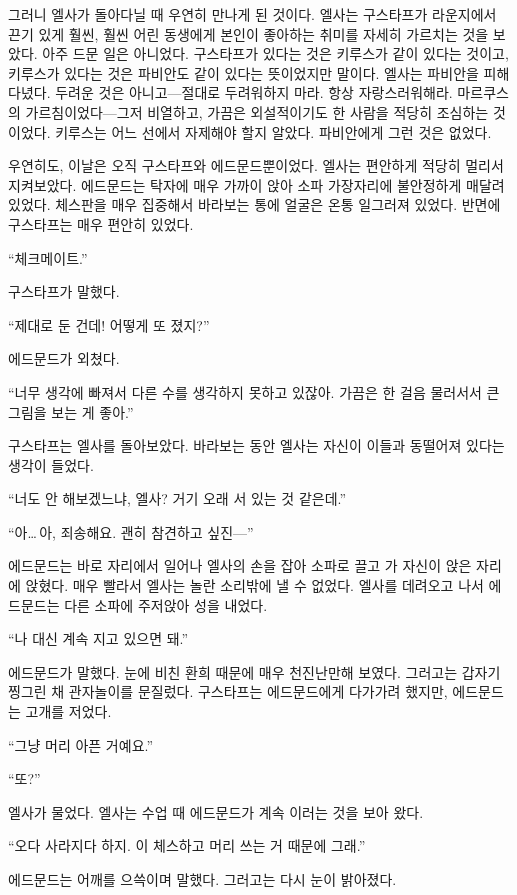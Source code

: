 그러니 엘사가 돌아다닐 때 우연히 만나게 된 것이다. 엘사는 구스타프가 라운지에서 끈기 있게 훨씬, 훨씬 어린 동생에게 본인이 좋아하는 취미를 자세히 가르치는 것을 보았다. 아주 드문 일은 아니었다. 구스타프가 있다는 것은 키루스가 같이 있다는 것이고, 키루스가 있다는 것은 파비안도 같이 있다는 뜻이었지만 말이다. 엘사는 파비안을 피해 다녔다. 두려운 것은 아니고—절대로 두려워하지 마라. 항상 자랑스러워해라. 마르쿠스의 가르침이었다—그저 비열하고, 가끔은 외설적이기도 한 사람을 적당히 조심하는 것이었다. 키루스는 어느 선에서 자제해야 할지 알았다. 파비안에게 그런 것은 없었다.

우연히도, 이날은 오직 구스타프와 에드문드뿐이었다. 엘사는 편안하게 적당히 멀리서 지켜보았다. 에드문드는 탁자에 매우 가까이 앉아 소파 가장자리에 불안정하게 매달려 있었다. 체스판을 매우 집중해서 바라보는 통에 얼굴은 온통 일그러져 있었다. 반면에 구스타프는 매우 편안히 있었다.

``체크메이트.''

구스타프가 말했다.

``제대로 둔 건데! 어떻게 또 졌지?''

에드문드가 외쳤다.

``너무 생각에 빠져서 다른 수를 생각하지 못하고 있잖아. 가끔은 한 걸음 물러서서 큰 그림을 보는 게 좋아.''

구스타프는 엘사를 돌아보았다. 바라보는 동안 엘사는 자신이 이들과 동떨어져 있다는 생각이 들었다.

``너도 안 해보겠느냐, 엘사? 거기 오래 서 있는 것 같은데.''

``아\ldots\,아, 죄송해요. 괜히 참견하고 싶진—''

에드문드는 바로 자리에서 일어나 엘사의 손을 잡아 소파로 끌고 가 자신이 앉은 자리에 앉혔다. 매우 빨라서 엘사는 놀란 소리밖에 낼 수 없었다. 엘사를 데려오고 나서 에드문드는 다른 소파에 주저앉아 성을 내었다.

``나 대신 계속 지고 있으면 돼.''

에드문드가 말했다. 눈에 비친 환희 때문에 매우 천진난만해 보였다. 그러고는 갑자기 찡그린 채 관자놀이를 문질렀다. 구스타프는 에드문드에게 다가가려 했지만, 에드문드는 고개를 저었다.

``그냥 머리 아픈 거예요.''

``또?''

엘사가 물었다. 엘사는 수업 때 에드문드가 계속 이러는 것을 보아 왔다.

``오다 사라지다 하지. 이 체스하고 머리 쓰는 거 때문에 그래.''

에드문드는 어깨를 으쓱이며 말했다. 그러고는 다시 눈이 밝아졌다.

